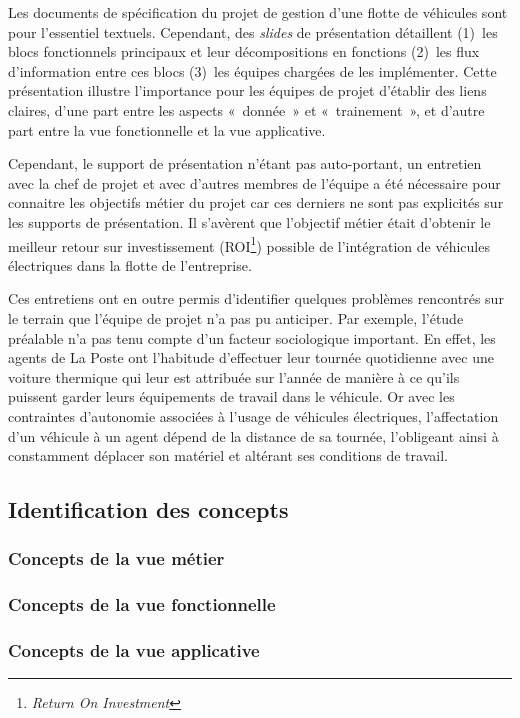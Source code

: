 Les documents de spécification du projet de gestion d'une flotte de véhicules
sont pour l'essentiel textuels. Cependant, des \textit{slides} de présentation
détaillent (1)~les blocs fonctionnels principaux et leur décompositions en
fonctions (2)~les flux d'information entre ces blocs (3)~les équipes chargées
de les implémenter. Cette présentation illustre l'importance pour les équipes
de projet d'établir des liens claires, d'une part entre les aspects «~donnée~»
et «~trainement~», et d'autre part entre la vue fonctionnelle et la vue
applicative.

Cependant, le support de présentation n'étant pas auto-portant, un entretien
avec la chef de projet et avec d'autres membres de l'équipe a été nécessaire
pour connaitre les objectifs métier du projet car ces derniers ne sont pas
explicités sur les supports de présentation. Il s'avèrent que l'objectif métier
était d'obtenir le meilleur retour sur investissement
(ROI\footnote{\textit{Return On Investment}}) possible de l'intégration de
véhicules électriques dans la flotte de l'entreprise.

Ces entretiens ont en outre permis d'identifier quelques problèmes rencontrés
sur le terrain que l'équipe de projet n'a pas pu anticiper. Par exemple, l'étude
préalable n'a pas tenu compte d'un facteur sociologique important. En effet,
les agents de La Poste ont l'habitude d'effectuer leur tournée quotidienne avec
une voiture thermique qui leur est attribuée sur l'année de manière à ce qu'ils
puissent garder leurs équipements de travail dans le véhicule. Or avec les
contraintes d'autonomie associées à l'usage de véhicules électriques,
l'affectation d'un véhicule à un agent dépend de la distance de sa tournée,
l'obligeant ainsi à constamment déplacer son matériel et altérant ses
conditions de travail.

\subsection{Identification des concepts}

    \subsubsection{Concepts de la vue métier}
    \subsubsection{Concepts de la vue fonctionnelle}
    \subsubsection{Concepts de la vue applicative}
